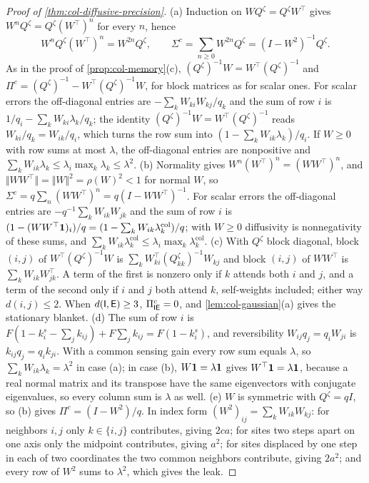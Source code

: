 \begin{proof}[Proof of \cref{thm:col-diffusive-precision}]
(a) Induction on $WQ^{\zeta}=Q^{\zeta}W^\top$ gives $W^nQ^{\zeta}=Q^{\zeta}(W^\top)^n$ for every $n$, hence
\[
W^nQ^{\zeta}(W^\top)^n=W^{2n}Q^{\zeta},\qquad\Sigma^c=\sum_{n\ge0}W^{2n}Q^{\zeta}=(I-W^2)^{-1}Q^{\zeta}.
\]
As in the proof of \cref{prop:col-memory}(c), $(Q^{\zeta})^{-1}W=W^\top(Q^{\zeta})^{-1}$ and $\Pi^c=(Q^{\zeta})^{-1}-W^\top(Q^{\zeta})^{-1}W$, for block matrices as for scalar ones. For scalar errors the off-diagonal entries are $-\sum_kW_{ki}W_{kj}/q_k$ and the sum of row $i$ is $1/q_i-\sum_kW_{ki}\lambda_k/q_k$; the identity $(Q^{\zeta})^{-1}W=W^\top(Q^{\zeta})^{-1}$ reads $W_{ki}/q_k=W_{ik}/q_i$, which turns the row sum into $(1-\sum_kW_{ik}\lambda_k)/q_i$. If $W\ge0$ with row sums at most $\lambda$, the off-diagonal entries are nonpositive and $\sum_kW_{ik}\lambda_k\le\lambda_i\max_k\lambda_k\le\lambda^2$. (b) Normality gives $W^n(W^\top)^n=(WW^\top)^n$, and $\Vert WW^\top\Vert=\Vert W\Vert^2=\rho(W)^2<1$ for normal $W$, so $\Sigma^c=q\sum_n(WW^\top)^n=q(I-WW^\top)^{-1}$. For scalar errors the off-diagonal entries are $-q^{-1}\sum_kW_{ik}W_{jk}$ and the sum of row $i$ is $(1-(WW^\top\mathbf{1})_i)/q=(1-\sum_kW_{ik}\lambda^{\mathrm{col}}_k)/q$; with $W\ge0$ diffusivity is nonnegativity of these sums, and $\sum_kW_{ik}\lambda^{\mathrm{col}}_k\le\lambda_i\max_k\lambda^{\mathrm{col}}_k$. (c) With $Q^{\zeta}$ block diagonal, block $(i,j)$ of $W^\top(Q^{\zeta})^{-1}W$ is $\sum_kW_{ki}^\top(Q^{\zeta}_{kk})^{-1}W_{kj}$ and block $(i,j)$ of $WW^\top$ is $\sum_kW_{ik}W_{jk}^\top$. A term of the first is nonzero only if $k$ attends both $i$ and $j$, and a term of the second only if $i$ and $j$ both attend $k$, self-weights included; either way $d(i,j)\le2$. When $d(\mathsf{I},\mathsf{E})\ge3$, $\Pi^c_{\mathsf{I}\mathsf{E}}=0$, and \cref{lem:col-gaussian}(a) gives the stationary blanket. (d) The sum of row $i$ is $F(1-k^s_i-\sum_jk_{ij})+F\sum_jk_{ij}=F(1-k^s_i)$, and reversibility $W_{ij}q_j=q_iW_{ji}$ is $k_{ij}q_j=q_ik_{ji}$. With a common sensing gain every row sum equals $\lambda$, so $\sum_kW_{ik}\lambda_k=\lambda^2$ in case (a); in case (b), $W\mathbf{1}=\lambda\mathbf{1}$ gives $W^\top\mathbf{1}=\lambda\mathbf{1}$, because a real normal matrix and its transpose have the same eigenvectors with conjugate eigenvalues, so every column sum is $\lambda$ as well. (e) $W$ is symmetric with $Q^{\zeta}=qI$, so (b) gives $\Pi^c=(I-W^2)/q$. In index form $(W^2)_{ij}=\sum_kW_{ik}W_{kj}$: for neighbors $i,j$ only $k\in\{i,j\}$ contributes, giving $2ca$; for sites two steps apart on one axis only the midpoint contributes, giving $a^2$; for sites displaced by one step in each of two coordinates the two common neighbors contribute, giving $2a^2$; and every row of $W^2$ sums to $\lambda^2$, which gives the leak.
\end{proof}

